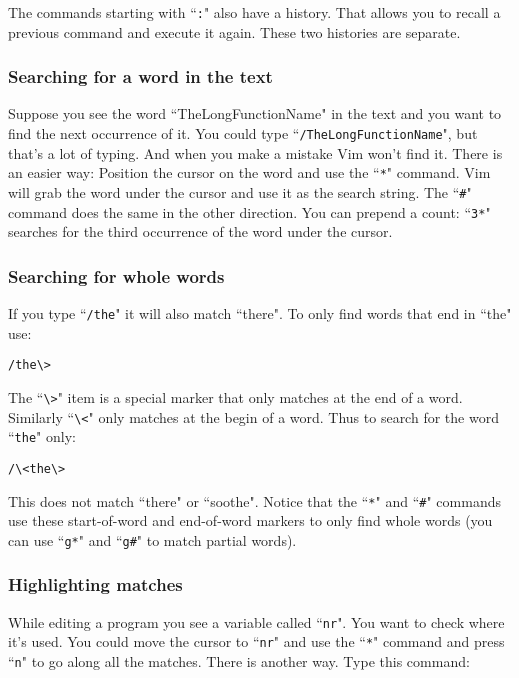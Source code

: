 The commands starting with ``\texttt{:}" also have a history.
That allows you to recall a previous command and execute it again.
These two histories are separate.

\subsubsection{Searching for a word in the text}

Suppose you see the word ``TheLongFunctionName" in the text and you want to find the next occurrence of it.
You could type ``\texttt{/TheLongFunctionName}", but that's a lot of typing.
And when you make a mistake Vim won't find it.
There is an easier way: Position the cursor on the word and use the ``\texttt{*}" command.
Vim will grab the word under the cursor and use it as the search string.
The ``\texttt{\#}" command does the same in the other direction.
You can prepend a count: ``\texttt{3*}" searches for the third occurrence of the word under the cursor.

\subsubsection{Searching for whole words}

If you type ``\texttt{/the}" it will also match ``there".
To only find words that end in ``the" use:

 \begin{Verbatim}[samepage=true]
 /the\>
 \end{Verbatim}

 The ``\texttt{\textbackslash{}>}" item is a special marker that only matches at the end of a word.
 Similarly ``\texttt{\textbackslash{}<}" only matches at the begin of a word.
Thus to search for the word ``\texttt{the}" only:

 \begin{Verbatim}[samepage=true]
 /\<the\>
 \end{Verbatim}

This does not match ``there" or ``soothe".
Notice that the ``\texttt{*}" and ``\texttt{\#}" commands use these start-of-word and end-of-word markers to only find whole words (you can use ``\texttt{g*}" and ``\texttt{g\#}" to match partial words).

\subsubsection{Highlighting matches}

While editing a program you see a variable called ``\texttt{nr}".
You want to check where it's used.
You could move the cursor to ``\texttt{nr}" and use the ``\texttt{*}" command and press ``\texttt{n}" to go along all the matches.
There is another way.
Type this command:

